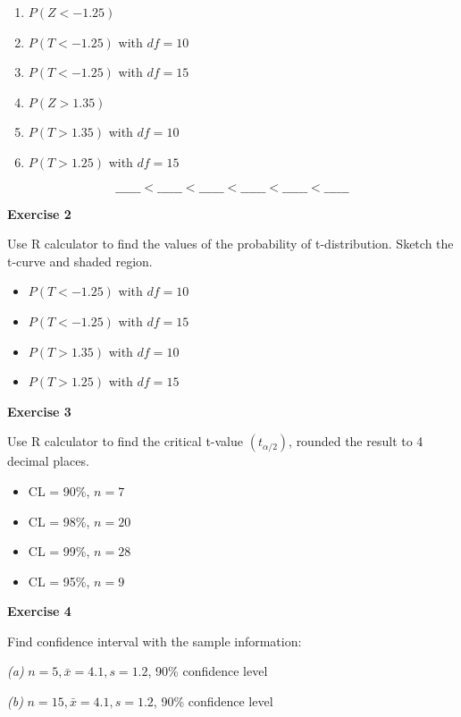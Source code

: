 \documentclass[
]{book}
\providecommand{\tightlist}{%
  \setlength{\itemsep}{0pt}\setlength{\parskip}{0pt}}
\begin{document}
\begin{enumerate}
\def\labelenumi{\alph{enumi})}
\tightlist
\item
  \(P(Z < -1.25)\)\\
\item
  \(P(T < -1.25)\) with \(df=10\)\\
\item
  \(P(T < -1.25)\) with \(df=15\)\\
\item
  \(P(Z > 1.35)\)\\
\item
  \(P(T > 1.35)\) with \(df=10\)\\
\item
  \(P(T > 1.25)\) with \(df=15\)
\end{enumerate}

\[ \_\_\_\_\_\_ < \_\_\_\_\_\_ < \_\_\_\_\_\_ < \_\_\_\_\_\_ < \_\_\_\_\_\_ < \_\_\_\_\_\_ \]

\textbf{Exercise 2}

Use R calculator to find the values of the probability of t-distribution. Sketch the t-curve and shaded region.

\begin{itemize}
\tightlist
\item
  \(P(T < -1.25)\) with \(df=10\)
\item
  \(P(T < -1.25)\) with \(df=15\)
\item
  \(P(T > 1.35)\) with \(df=10\)
\item
  \(P(T > 1.25)\) with \(df=15\)
\end{itemize}

\textbf{Exercise 3}

Use R calculator to find the critical t-value \((t_{\alpha/2})\), rounded the result to 4 decimal places.

\begin{itemize}
\tightlist
\item
  CL = 90\%, \(n = 7\)
\item
  CL = 98\%, \(n = 20\)
\item
  CL = 99\%, \(n = 28\)
\item
  CL = 95\%, \(n = 9\)
\end{itemize}

\textbf{Exercise 4}

Find confidence interval with the sample information:

\emph{(a)} \(n=5, \bar{x}=4.1, s=1.2\), 90\% confidence level

\emph{(b)} \(n=15, \bar{x}=4.1, s=1.2\), 90\% confidence level
\end{document}
